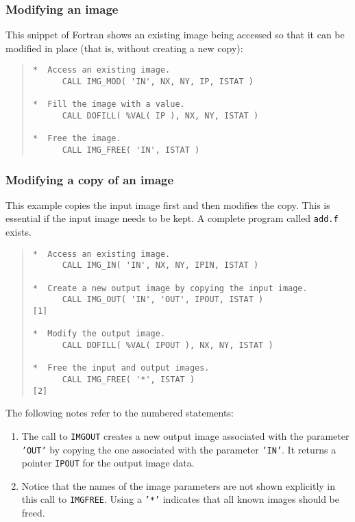 \documentclass[twoside,11pt]{article}
\newcommand{\htmladdnormallink}[2]{#1}
\newcommand{\htmlref}[2]{#1}
\renewcommand{\_}{\texttt{\symbol{95}}}
\newcommand{\myverb}[1]{{\texttt{#1}}}
\newcommand{\mynote}{The following notes refer to the numbered statements:}
\newenvironment{code}{\begin{small} \begin{quote}}
                     {\end{quote} \end{small}}
\newenvironment{enumnotes}
{
   \renewcommand{\labelenumi}{\myverb{[\theenumi]}}
   \begin{enumerate}
}{
   \end{enumerate}
   \renewcommand{\labelenumi}{\theenumi}
}
\renewenvironment{enumnotes}
  {
    \begin{enumerate}
  }{
    \end{enumerate}
  }
\begin{document}
\subsubsection{Modifying an image}

This snippet of Fortran shows an existing image being accessed so that
it can be modified in place (that is, without creating a new copy):
\begin{code}
\begin{verbatim}
*  Access an existing image.
      CALL IMG_MOD( 'IN', NX, NY, IP, ISTAT )

*  Fill the image with a value.
      CALL DOFILL( %VAL( IP ), NX, NY, ISTAT )

*  Free the image.
      CALL IMG_FREE( 'IN', ISTAT )
\end{verbatim}
\end{code}

\subsubsection{Modifying a copy of an image}

This example copies the input image first and then modifies the
copy. This is essential if the input image needs to be kept.
A complete program called
\htmladdnormallink{\myverb{add.f}}{../../bin/examples/img/add.f}
exists.
\begin{code}
\begin{verbatim}
*  Access an existing image.
      CALL IMG_IN( 'IN', NX, NY, IPIN, ISTAT )

*  Create a new output image by copying the input image.
      CALL IMG_OUT( 'IN', 'OUT', IPOUT, ISTAT )               [1]

*  Modify the output image.
      CALL DOFILL( %VAL( IPOUT ), NX, NY, ISTAT )

*  Free the input and output images.
      CALL IMG_FREE( '*', ISTAT )                             [2]
\end{verbatim}
\end{code}
\mynote
\begin{enumnotes}
\item The call to \htmlref{\myverb{IMG\_OUT}}{IMG_OUTx} creates a new output image
associated with the parameter \myverb{'OUT'} by copying the one
associated with the parameter \myverb{'IN'}. It returns a pointer
\myverb{IPOUT} for the output image data.

\item Notice that the names of the image parameters are not shown
explicitly in this call to \htmlref{\myverb{IMG\_FREE}}{IMG_FREE}. Using a \myverb{'*'}
indicates that all known images should be freed.
\end{enumnotes}
\end{document}
